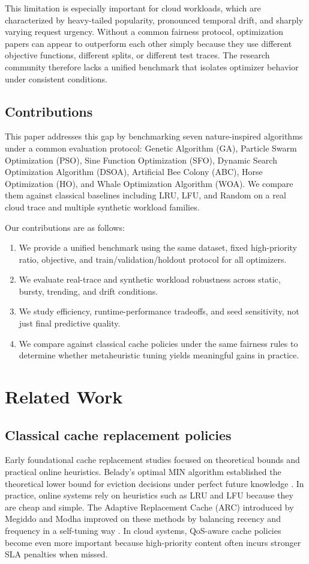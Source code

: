\documentclass[10pt,journal,compsoc]{IEEEtran}
\begin{document}
This limitation is especially important for cloud workloads, which are characterized by heavy-tailed popularity, pronounced temporal drift, and sharply varying request urgency. Without a common fairness protocol, optimization papers can appear to outperform each other simply because they use different objective functions, different splits, or different test traces. The research community therefore lacks a unified benchmark that isolates optimizer behavior under consistent conditions.

\subsection{Contributions}
This paper addresses this gap by benchmarking seven nature-inspired algorithms under a common evaluation protocol: Genetic Algorithm (GA), Particle Swarm Optimization (PSO), Sine Function Optimization (SFO), Dynamic Search Optimization Algorithm (DSOA), Artificial Bee Colony (ABC), Horse Optimization (HO), and Whale Optimization Algorithm (WOA). We compare them against classical baselines including LRU, LFU, and Random on a real cloud trace and multiple synthetic workload families.

Our contributions are as follows:
\begin{enumerate}
    \item We provide a unified benchmark using the same dataset, fixed high-priority ratio, objective, and train/validation/holdout protocol for all optimizers.
    \item We evaluate real-trace and synthetic workload robustness across static, bursty, trending, and drift conditions.
    \item We study efficiency, runtime-performance tradeoffs, and seed sensitivity, not just final predictive quality.
    \item We compare against classical cache policies under the same fairness rules to determine whether metaheuristic tuning yields meaningful gains in practice.
\end{enumerate}

\section{Related Work}
\subsection{Classical cache replacement policies}
Early foundational cache replacement studies focused on theoretical bounds and practical online heuristics. Belady's optimal MIN algorithm established the theoretical lower bound for eviction decisions under perfect future knowledge \cite{belady1966study}. In practice, online systems rely on heuristics such as LRU and LFU because they are cheap and simple. The Adaptive Replacement Cache (ARC) introduced by Megiddo and Modha improved on these methods by balancing recency and frequency in a self-tuning way \cite{megiddo2003arc}. In cloud systems, QoS-aware cache policies become even more important because high-priority content often incurs stronger SLA penalties when missed.
\end{document}
